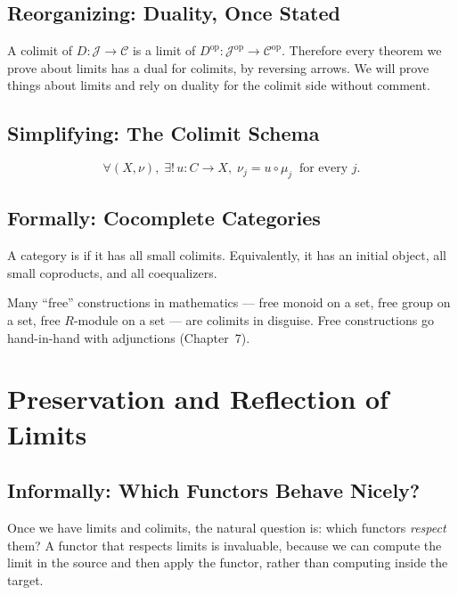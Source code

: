 \subsection{Reorganizing: Duality, Once Stated}

A colimit of $D : \mathcal{J} \to \mathcal{C}$ is a limit of
$D^{\mathrm{op}} : \mathcal{J}^{\mathrm{op}} \to \mathcal{C}^{\mathrm{op}}$.
Therefore every theorem we prove about limits has a dual for colimits, by
reversing arrows. We will prove things about limits and rely on duality
for the colimit side without comment.

\subsection{Simplifying: The Colimit Schema}

\begin{equation*}
  \boxed{\;
  \forall (X, \nu),\;
  \exists !\, u : C \to X,\;
  \nu_j = u \circ \mu_j \;\;\text{for every } j.
  \;}
\end{equation*}

\subsection{Formally: Cocomplete Categories}

A category is  if it has all small colimits. Equivalently,
it has an initial object, all small coproducts, and all coequalizers.

Many ``free'' constructions in mathematics --- free monoid on a set, free
group on a set, free $R$-module on a set --- are colimits in disguise.
Free constructions go hand-in-hand with adjunctions (Chapter~7).


\section{Preservation and Reflection of Limits}
\label{sec:preservation}

\subsection{Informally: Which Functors Behave Nicely?}

Once we have limits and colimits, the natural question is: which functors
\emph{respect} them? A functor that respects limits is invaluable, because
we can compute the limit in the source and then apply the functor, rather
than computing inside the target.

